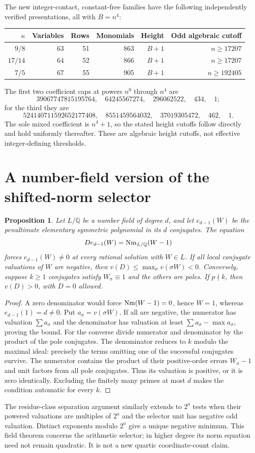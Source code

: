 \documentclass[11pt,a4paper]{article}
\newtheorem{proposition}[theorem]{Proposition}
\newcommand{\Q}{\mathbb Q}\newcommand{\Z}{\mathbb Z}
\begin{document}
The new integer-contact, constant-free families have the following
independently verified presentations, all with $B=n^4$:
\begin{center}
\begin{tabular}{rrrrrr}
\toprule
$\kappa$&Variables&Rows&Monomials&Height&Odd algebraic cutoff\\
\midrule
$9/8$&63&51&863&$B+1$&$n\ge17207$\\
$17/14$&64&52&866&$B+1$&$n\ge17207$\\
$7/5$&67&55&905&$B+1$&$n\ge192405$\\
\bottomrule
\end{tabular}
\end{center}
The first two coefficient caps at powers $n^0$ through $n^4$ are
\[
 39067747815195764,\quad64245567274,\quad296062522,\quad434,\quad1;
\]
for the third they are
\[
 524140711592652177408,\quad8551459564032,\quad37019305472,\quad462,\quad1.
\]
The sole mixed coefficient is $n^4+1$, so the stated height cutoffs
follow directly and hold uniformly thereafter. These are algebraic
height cutoffs, not effective integer-defining thresholds.

\section{A number-field version of the shifted-norm selector}
\begin{proposition}
Let $L/\Q$ be a number field of degree $d$, and let
$e_{d-1}(W)$ be the penultimate elementary symmetric polynomial in its
$d$ conjugates. The equation
\[
                D e_{d-1}(W)=\Nm_{L/\Q}(W-1)
\]
forces $e_{d-1}(W)\ne0$ at every rational solution with $W\in L$.
If all local conjugate valuations of $W$ are negative, then
$v(D)\le\max_\sigma v(\sigma W)<0$. Conversely, suppose $k\ge1$
conjugates satisfy $W_\sigma\equiv1$ and the others are poles.
If $p\nmid k$, then $v(D)>0$, with $D=0$ allowed.
\end{proposition}
\begin{proof}
A zero denominator would force $\operatorname{Nm}(W-1)=0$, hence $W=1$, whereas
$e_{d-1}(1)=d\ne0$. Put $a_\sigma=v(\sigma W)$. If all are negative,
the numerator has valuation $\sum a_\sigma$ and the denominator has
valuation at least $\sum a_\sigma-\max a_\sigma$, proving the bound.
For the converse divide numerator and denominator by the product of
the pole conjugates. The denominator reduces to $k$ modulo the maximal
ideal: precisely the terms omitting one of the successful conjugates
survive. The numerator contains the product of their positive-order
errors $W_\sigma-1$ and unit factors from all pole conjugates. Thus its
valuation is positive, or it is zero identically. Excluding the finitely
many primes at most $d$ makes the condition automatic for every $k$.
\end{proof}
The residue-class separation argument similarly extends to $2^a$ tests
when their powered valuations are multiples of $2^a$ and the selector
unit has negative odd valuation. Distinct exponents modulo $2^a$ give
a unique negative minimum. This field theorem concerns the arithmetic
selector; in higher degree its norm equation need not remain quadratic.
It is not a new quartic coordinate-count claim.
\end{document}
